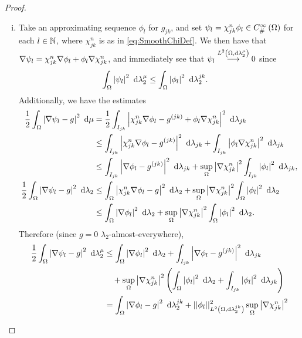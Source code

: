 \begin{proof}
	\begin{enumerate}[(i)]
		\item Take an approximating sequence $\phi_l$ for $g_{jk}$, and set $\psi_l = \chi_{jk}^n\phi_l\in C^{\infty}_{\#}\left( \Omega \right)$ for each $l\in\mathbb{N}$, where $\chi_{jk}^n$ is as in \eqref{eq:SmoothChiDef}.
		We then have that $\nabla\psi_l = \chi_{jk}^n\nabla\phi_l + \phi_l\nabla\chi_{jk}^n$, and immediately see that $\psi_l\overset{L^{2}\left( \Omega,\mathrm{d} \lambda_2^{\mu} \right)}{\longrightarrow}0$ since
		\begin{align*}
			\int_{\Omega}\left\lvert  \psi_l  \right\rvert^2 \ \mathrm{d}\lambda_2^{\mu}
			&\leq \int_{\Omega}\left\lvert  \phi_l  \right\rvert^2 \ \mathrm{d}\lambda_2^{jk}.
		\end{align*}
		Additionally, we have the estimates
		\begin{align*}
			\frac{1}{2}\int_{\Omega}\left\lvert  \nabla\psi_l - g  \right\rvert^2 \ \mathrm{d}\mu
			&= \frac{1}{2}\int_{I_{jk}}\left\lvert  \chi_{jk}^n\nabla\phi_l - g^{(jk)}  + \phi_l\nabla\chi_{jk}^n  \right\rvert^2 \ \mathrm{d}\lambda_{jk} \\
			&\leq \int_{I_{jk}}\left\lvert  \chi_{jk}^n\nabla\phi_l - g^{(jk)}  \right\rvert^2 \ \mathrm{d}\lambda_{jk}
			+ \int_{I_{jk}}\left\lvert  \phi_l\nabla\chi_{jk}^n  \right\rvert^2 \ \mathrm{d}\lambda_{jk} \\
			&\leq \int_{I_{jk}}\left\lvert  \nabla\phi_l - g^{(jk)}  \right\rvert^2 \ \mathrm{d}\lambda_{jk}
			+ \sup_{\Omega}\left\lvert \nabla\chi_{jk}^n \right\rvert^2 \int_{I_{jk}}\left\lvert  \phi_l  \right\rvert^2 \ \mathrm{d}\lambda_{jk}, \\
			\frac{1}{2}\int_{\Omega}\left\lvert  \nabla\psi_l - g  \right\rvert^2 \ \mathrm{d}\lambda_2
			&\leq \int_{\Omega}\left\lvert  \chi_{jk}^n\nabla\phi_l - g  \right\rvert^2 \ \mathrm{d}\lambda_2
			+ \sup_{\Omega}\left\lvert \nabla\chi_{jk}^n \right\rvert^2 \int_{\Omega}\left\lvert  \phi_l  \right\rvert^2 \ \mathrm{d}\lambda_2 \\
			&\leq \int_{\Omega}\left\lvert  \nabla\phi_l  \right\rvert^2 \ \mathrm{d}\lambda_2
			+ \sup_{\Omega}\left\lvert \nabla\chi_{jk}^n \right\rvert^2 \int_{\Omega}\left\lvert  \phi_l  \right\rvert^2 \ \mathrm{d}\lambda_2.
		\end{align*}
		Therefore (since $g=0$ $\lambda_2$-almost-everywhere),
		\begin{align*}
			\recip{2}\integral{\ddom}{\abs{ \grad\psi_l - g }^2}{\compMes}
			&\leq \integral{\ddom}{\abs{ \grad\phi_l }^2}{\lambda_2}
			+ \integral{I_{jk}}{\abs{ \grad\phi_l - g^{(jk)} }^2}{\lambda_{jk}} \\
			&\quad + \sup_{\ddom}\abs{\grad\chi_{jk}^n}^2 
			\bracs{ \integral{\ddom}{\abs{ \phi_l }^2}{\lambda_2} 	+ \integral{I_{jk}}{\abs{ \phi_l }^2}{\lambda_{jk}} } \\
			&= \integral{\ddom}{\abs{ \grad\phi_l - g }^2}{\lcompMes}
			+ \norm{\phi_l}_{\ltwo{\ddom}{\lcompMes}}^2 \sup_{\ddom}\abs{\grad\chi_{jk}^n}^2 \\

\end{align*}
\end{enumerate}
\end{proof}
